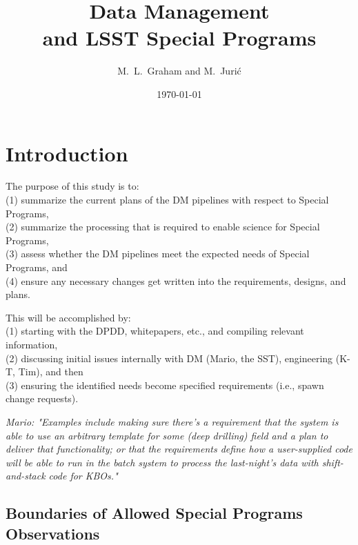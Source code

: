 \documentclass[DM,lsstdraft,toc]{lsstdoc}
\title[LSST Special Programs]{Data Management \\ and LSST Special Programs}
\author{M.~L.~Graham and M.~Juri\'{c}}
\date{\today}
\begin{document}
\maketitle




\section{Introduction} \label{sec:intro}

\noindent The purpose of this study is to: \\
(1) summarize the current plans of the DM pipelines with respect to Special Programs, \\
(2) summarize the processing that is required to enable science for Special Programs, \\
(3) assess whether the DM pipelines meet the expected needs of Special Programs, and \\
(4) ensure any necessary changes get written into the requirements, designs, and plans.

\noindent This will be accomplished by: \\
(1) starting with the DPDD, whitepapers, etc., and compiling relevant information, \\
(2) discussing initial issues internally with DM (Mario, the SST), engineering (K-T, Tim), and then \\
(3) ensuring the identified needs become specified requirements (i.e., spawn change requests).

{\it Mario: "Examples include making sure there's a requirement that the system is able to use an arbitrary template for some (deep drilling) field and a plan to deliver that functionality; or that the requirements define how a user-supplied code will be able to run in the batch system to process the last-night's data with shift-and-stack code for KBOs."}

\subsection{Boundaries of Allowed Special Programs Observations}\label{ssec:intro_bounds}
\end{document}
